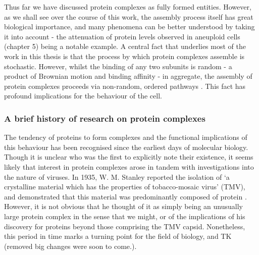 \documentclass[a4paper,11pt,twoside,openright]{scrbook}
\begin{document}
Thus far we have discussed protein complexes as fully formed entities. However, as we shall see over the course of this work, the assembly process itself has great biological importance, and many phenomena can be better understood by taking it into account - the attenuation of protein levels observed in aneuploid cells (chapter 5) being a notable example. A central fact that underlies most of the work in this thesis is that the process by which protein complexes assemble is stochastic. However, whilst the binding of any two subunits is random - a product of Brownian motion and binding affinity - in aggregate, the assembly of protein complexes proceeds via non-random, ordered pathways \cite{Levy2008a, Marsh2013}. This fact has profound implications for the behaviour of the cell.


\subsubsection{A brief history of research on protein complexes}
The tendency of proteins to form complexes and the functional implications of this behaviour has been recognised since the earliest days of molecular biology. Though it is unclear who was the first to explicitly note their existence, it seems likely that interest in protein complexes arose in tandem with investigations into the nature of viruses. In 1935, W. M. Stanley reported the isolation of `a crystalline material which has the properties of tobacco-mosaic virus' (TMV), and demonstrated that this material was predominantly composed of protein \cite{Stanley1935}. However, it is not obvious that he thought of it as simply being an unusually large protein complex in the sense that we might, or of the implications of his discovery for proteins beyond those comprising the TMV capsid. Nonetheless, this period in time marks a turning point for the field of biology, and TK (removed big changes were soon to come.).
\end{document}
